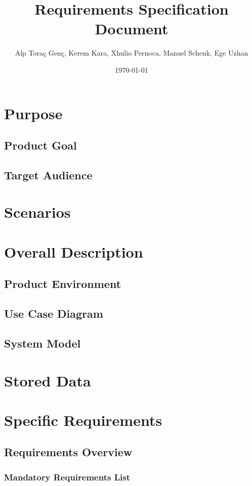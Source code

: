 \documentclass[10pt,a4paper]{report}
\title{Requirements Specification Document}
\author{Alp Toraç Genç, Kerem Kara, Xhulio Pernoca, Manuel Schenk, Ege Uzhan}
\date{\today}
\begin{document}
\maketitle
\tableofcontents

\chapter{Purpose}
\section{Product Goal}
\section{Target Audience}
\chapter{Scenarios}

\chapter{Overall Description}
\section{Product Environment}
\section{Use Case Diagram}
\section{System Model}

\chapter{Stored Data}

\chapter{Specific Requirements}
\section{Requirements Overview}
\subsection{Mandatory Requirements List}
\end{document}
